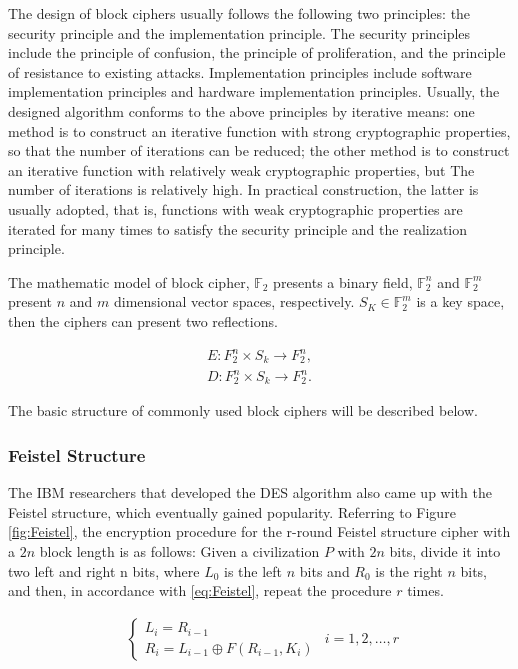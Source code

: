 The design of block ciphers usually follows the following two principles: the security principle and the implementation principle. The security principles include the principle of confusion, the principle of proliferation, and the principle of resistance to existing attacks. Implementation principles include software implementation principles and hardware implementation principles. Usually, the designed algorithm conforms to the above principles by iterative means: one method is to construct an iterative function with strong cryptographic properties, so that the number of iterations can be reduced; the other method is to construct an iterative function with relatively weak cryptographic properties, but The number of iterations is relatively high. In practical construction, the latter is usually adopted, that is, functions with weak cryptographic properties are iterated for many times to satisfy the security principle and the realization principle. 

The mathematic model of block cipher, $\mathbb{F}_2$ presents a binary field, $\mathbb{F}_2^n$ and $\mathbb{F}_2^m$ present $n$ and $m$ dimensional vector spaces, respectively. $S_K\in \mathbb{F}_2^m$ is a key space, then the ciphers can present two reflections.

\begin{equation}
    \begin{aligned}
        E: F_2^n \times S_k \to F_2^n,\\
        D: F_2^n \times S_k \to F_2^n.
    \end{aligned}
\end{equation}


The basic structure of commonly used block ciphers will be described below.

\subsubsection{Feistel Structure}
The IBM researchers that developed the DES algorithm also came up with the Feistel structure, which eventually gained popularity. Referring to Figure \ref{fig:Feistel}, the encryption procedure for the r-round Feistel structure cipher with a $2n$ block length is as follows: Given a civilization $P$ with $2n$ bits, divide it into two left and right n bits, where $L_0$ is the left $n$ bits and $R_0$ is the right $n$ bits, and then, in accordance with \eqref{eq:Feistel}, repeat the procedure $r$ times.

\begin{equation}
    \begin{aligned}
        \begin{cases}
            L_i = R_{i-1}\\
            R_i=L_{i-1}\oplus F(R_{i-1},K_i)
        \end{cases}
    \end{aligned}  
    i=1,2,\dots,r  
    \label{eq:Feistel}
\end{equation}

